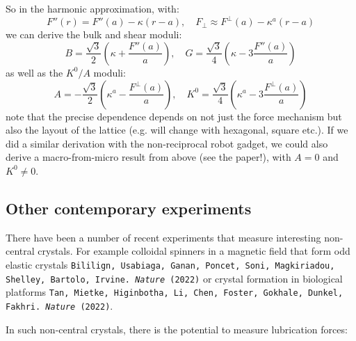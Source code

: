 So in the harmonic approximation, with:
\begin{equation}
    F''(r) = F''(a) - \kappa(r - a), \quad F_\perp \approx F^\perp(a) - \kappa^a(r - a)
\end{equation}
we can derive the bulk and shear moduli:
\begin{equation}
    B = \frac{\sqrt{3}}{2}\left(\kappa + \frac{F''(a)}{a}\right), \quad G = \frac{\sqrt{3}}{4}\left(\kappa - 3\frac{F''(a)}{a}\right)
\end{equation}
as well as the $K^0/A$ moduli:
\begin{equation}
    A = -\frac{\sqrt{3}}{2}\left(\kappa^a - \frac{F^\perp(a)}{a}\right), \quad K^0 = \frac{\sqrt{3}}{4}\left(\kappa^a - 3\frac{F^\perp(a)}{a}\right)
\end{equation}
note that the precise dependence depends on not just the force mechanism but also the layout of the lattice (e.g. will change with hexagonal, square etc.). If we did a similar derivation with the non-reciprocal robot gadget, we could also derive a macro-from-micro result from above (see the paper!), with $A = 0$ and $K^0 \neq 0$.

\subsection{Other contemporary experiments}

There have been a number of recent experiments that measure interesting non-central crystals. For example colloidal spinners in a magnetic field that form odd elastic crystals \texttt{Bililign, Usabiaga, Ganan, Poncet, Soni, Magkiriadou, Shelley, Bartolo, Irvine. \emph{Nature} (2022)} or crystal formation in biological platforms \texttt{Tan, Mietke, Higinbotha, Li, Chen, Foster, Gokhale, Dunkel, Fakhri. \emph{Nature} (2022)}.

In such non-central crystals, there is the potential to measure lubrication forces:

